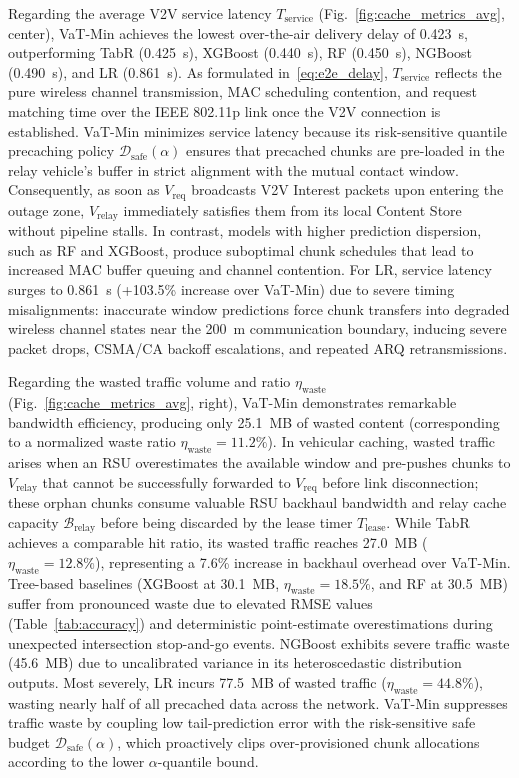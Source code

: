 \documentclass[journal]{IEEEtran}
\begin{document}
Regarding the average V2V service latency $T_{\text{service}}$ (Fig.~\ref{fig:cache_metrics_avg}, center), VaT-Min achieves the lowest over-the-air delivery delay of 0.423~s, outperforming TabR (0.425~s), XGBoost (0.440~s), RF (0.450~s), NGBoost (0.490~s), and LR (0.861~s). As formulated in~\eqref{eq:e2e_delay}, $T_{\text{service}}$ reflects the pure wireless channel transmission, MAC scheduling contention, and request matching time over the IEEE 802.11p link once the V2V connection is established. VaT-Min minimizes service latency because its risk-sensitive quantile precaching policy $\mathcal{D}_{\text{safe}}(\alpha)$ ensures that precached chunks are pre-loaded in the relay vehicle's buffer in strict alignment with the mutual contact window. Consequently, as soon as $V_{\text{req}}$ broadcasts V2V Interest packets upon entering the outage zone, $V_{\text{relay}}$ immediately satisfies them from its local Content Store without pipeline stalls. In contrast, models with higher prediction dispersion, such as RF and XGBoost, produce suboptimal chunk schedules that lead to increased MAC buffer queuing and channel contention. For LR, service latency surges to 0.861~s (+103.5\% increase over VaT-Min) due to severe timing misalignments: inaccurate window predictions force chunk transfers into degraded wireless channel states near the 200~m communication boundary, inducing severe packet drops, CSMA/CA backoff escalations, and repeated ARQ retransmissions.

Regarding the wasted traffic volume and ratio $\eta_{\text{waste}}$ (Fig.~\ref{fig:cache_metrics_avg}, right), VaT-Min demonstrates remarkable bandwidth efficiency, producing only 25.1~MB of wasted content (corresponding to a normalized waste ratio $\eta_{\text{waste}} = 11.2\%$). In vehicular caching, wasted traffic arises when an RSU overestimates the available window and pre-pushes chunks to $V_{\text{relay}}$ that cannot be successfully forwarded to $V_{\text{req}}$ before link disconnection; these orphan chunks consume valuable RSU backhaul bandwidth and relay cache capacity $\mathcal{B}_{\text{relay}}$ before being discarded by the lease timer $T_{\text{lease}}$. While TabR achieves a comparable hit ratio, its wasted traffic reaches 27.0~MB ($\eta_{\text{waste}} = 12.8\%$), representing a 7.6\% increase in backhaul overhead over VaT-Min. Tree-based baselines (XGBoost at 30.1~MB, $\eta_{\text{waste}} = 18.5\%$, and RF at 30.5~MB) suffer from pronounced waste due to elevated RMSE values (Table~\ref{tab:accuracy}) and deterministic point-estimate overestimations during unexpected intersection stop-and-go events. NGBoost exhibits severe traffic waste (45.6~MB) due to uncalibrated variance in its heteroscedastic distribution outputs. Most severely, LR incurs 77.5~MB of wasted traffic ($\eta_{\text{waste}} = 44.8\%$), wasting nearly half of all precached data across the network. VaT-Min suppresses traffic waste by coupling low tail-prediction error with the risk-sensitive safe budget $\mathcal{D}_{\text{safe}}(\alpha)$, which proactively clips over-provisioned chunk allocations according to the lower $\alpha$-quantile bound.
\end{document}
